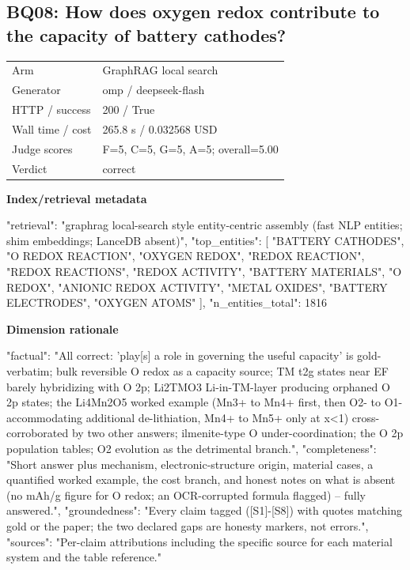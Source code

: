 \documentclass[10pt]{article}
\begin{document}
\subsection{BQ08: How does oxygen redox contribute to the capacity of battery cathodes?}
\begin{tabular}{@{}ll@{}}
Arm & GraphRAG local search\\
Generator & omp / deepseek-flash\\
HTTP / success & 200 / True\\
Wall time / cost & 265.8 s / 0.032568 USD\\
Judge scores & F=5, C=5, G=5, A=5; overall=5.00\\
Verdict & correct\\
\end{tabular}

\textbf{Index/retrieval metadata}
\begin{EvidenceText}
{
  "retrieval": "graphrag local-search style entity-centric assembly (fast NLP entities; shim embeddings; LanceDB absent)",
  "top_entities": [
    "BATTERY CATHODES",
    "O REDOX REACTION",
    "OXYGEN REDOX",
    "REDOX REACTION",
    "REDOX REACTIONS",
    "REDOX ACTIVITY",
    "BATTERY MATERIALS",
    "O REDOX",
    "ANIONIC REDOX ACTIVITY",
    "METAL OXIDES",
    "BATTERY ELECTRODES",
    "OXYGEN ATOMS"
  ],
  "n_entities_total": 1816
}
\end{EvidenceText}

\textbf{Dimension rationale}
\begin{EvidenceText}
{
  "factual": "All correct: 'play[s] a role in governing the useful capacity' is gold-verbatim; bulk reversible O redox as a capacity source; TM t2g states near EF barely hybridizing with O 2p; Li2TMO3 Li-in-TM-layer producing orphaned O 2p states; the Li4Mn2O5 worked example (Mn3+ to Mn4+ first, then O2- to O1- accommodating additional de-lithiation, Mn4+ to Mn5+ only at x<1) cross-corroborated by two other answers; ilmenite-type O under-coordination; the O 2p population tables; O2 evolution as the detrimental branch.",
  "completeness": "Short answer plus mechanism, electronic-structure origin, material cases, a quantified worked example, the cost branch, and honest notes on what is absent (no mAh/g figure for O redox; an OCR-corrupted formula flagged) -- fully answered.",
  "groundedness": "Every claim tagged ([S1]-[S8]) with quotes matching gold or the paper; the two declared gaps are honesty markers, not errors.",
  "sources": "Per-claim attributions including the specific source for each material system and the table reference."
}
\end{EvidenceText}
\end{document}
